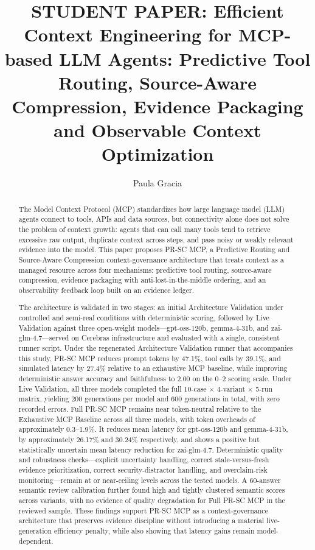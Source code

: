 \documentclass[jocse]{jocseart}
\begin{document}
\title{STUDENT PAPER: Efficient Context Engineering for MCP-based LLM Agents: Predictive Tool Routing, Source-Aware Compression, Evidence Packaging and Observable Context Optimization}


\author{Paula Gracia}

\begin{abstract}
The Model Context Protocol (MCP) standardizes how large language model (LLM) agents connect to tools, APIs and data sources, but connectivity alone does not solve the problem of context growth: agents that can call many tools tend to retrieve excessive raw output, duplicate context across steps, and pass noisy or weakly relevant evidence into the model. This paper proposes PR-SC MCP, a Predictive Routing and Source-Aware Compression context-governance architecture that treats context as a managed resource across four mechanisms: predictive tool routing, source-aware compression, evidence packaging with anti-lost-in-the-middle ordering, and an observability feedback loop built on an evidence ledger.

The architecture is validated in two stages: an initial Architecture Validation under controlled and semi-real conditions with deterministic scoring, followed by Live Validation against three open-weight models---gpt-oss-120b, gemma-4-31b, and zai-glm-4.7---served on Cerebras infrastructure and evaluated with a single, consistent runner script. Under the regenerated Architecture Validation runner that accompanies this study, PR-SC MCP reduces prompt tokens by 47.1\%, tool calls by 39.1\%, and simulated latency by 27.4\% relative to an exhaustive MCP baseline, while improving deterministic answer accuracy and faithfulness to 2.00 on the 0--2 scoring scale. Under Live Validation, all three models completed the full 10-case $\times$ 4-variant $\times$ 5-run matrix, yielding 200 generations per model and 600 generations in total, with zero recorded errors. Full PR-SC MCP remains near token-neutral relative to the Exhaustive MCP Baseline across all three models, with token overheads of approximately 0.3--1.9\%. It reduces mean latency for gpt-oss-120b and gemma-4-31b, by approximately 26.17\% and 30.24\% respectively, and shows a positive but statistically uncertain mean latency reduction for zai-glm-4.7. Deterministic quality and robustness checks---explicit uncertainty handling, correct stale-versus-fresh evidence prioritization, correct security-distractor handling, and overclaim-risk monitoring---remain at or near-ceiling levels across the tested models. A 60-answer semantic review calibration further found high and tightly clustered semantic scores across variants, with no evidence of quality degradation for Full PR-SC MCP in the reviewed sample. These findings support PR-SC MCP as a context-governance architecture that preserves evidence discipline without introducing a material live-generation efficiency penalty, while also showing that latency gains remain model-dependent.


\end{abstract}
\end{document}
